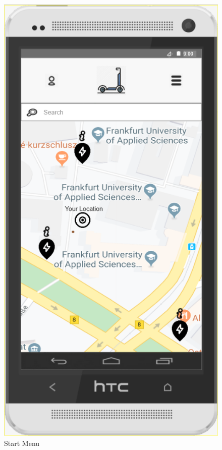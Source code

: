 \documentclass[a4paper, 12pt]{article}
\begin{document}
\begin{figure} [htbp]
\begin{center}
\begin{minipage}{0.45\textwidth}
\begin{center}
                 \includegraphics[scale=0.65]{images/prototypes/01-start-menu.png}
            \end{center}
            \caption{Start Menu}
        \end{minipage}\hfill

\end{center}
\end{figure}
\end{document}
